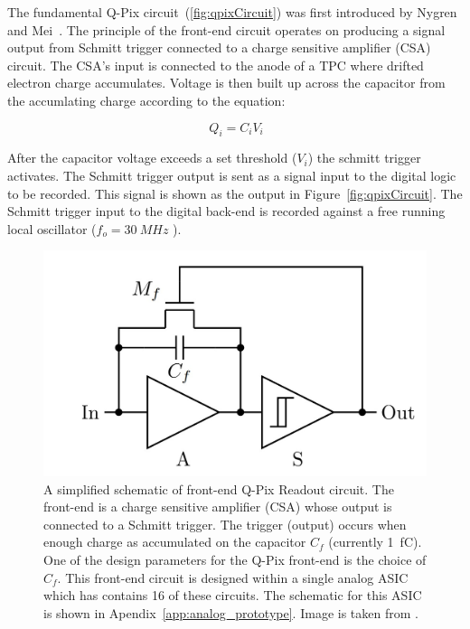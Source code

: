 The fundamental Q-Pix circuit~(\ref{fig:qpixCircuit}) was first introduced by Nygren and Mei~\citep{qpix:nygren:mei}.
The principle of the front-end circuit operates on producing a signal output from Schmitt trigger connected to a charge sensitive amplifier (CSA) circuit.
The CSA's input is connected to the anode of a TPC where drifted electron charge accumulates.
Voltage is then built up across the capacitor from the accumlating charge according to the equation:

\begin{equation}~\label{eq:capacitor}
Q_{i} = C_{i}V_{i}
\end{equation}

After the capacitor voltage exceeds a set threshold ($V_{i}$) the schmitt trigger activates.
The Schmitt trigger output is sent as a signal input to the digital logic to be recorded.
This signal is shown as the output in Figure~\ref{fig:qpixCircuit}.
The Schmitt trigger input to the digital back-end is recorded against a free running local oscillator ($f_{o} = 30~\unit{MHz}$ ).

\begin{figure}[]
\centering
\includegraphics[width=\textwidth]{images/qpix_circuit.jpg}
\caption{A simplified schematic of front-end Q-Pix Readout circuit.
The front-end is a charge sensitive amplifier (CSA) whose output is connected to a Schmitt trigger.
The trigger (output) occurs when enough charge as accumulated on the capacitor $C_{f}$ (currently 1~\unit{fC}).
One of the design parameters for the Q-Pix front-end is the choice of $C_{f}$.
This front-end circuit is designed within a single analog ASIC which has contains 16 of these circuits.
The schematic for this ASIC is shown in Apendix~\ref{app:analog_prototype}.
Image is taken from \citep{qpix:nygren:mei}.}
\end{figure}~\label{fig:qpixCircuit}

